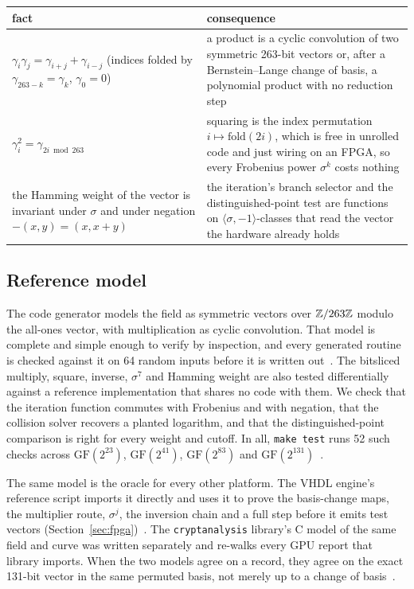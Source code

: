 \begin{center}
\small
\begin{tabular}{@{}p{}p{}@{}}
\toprule
fact & consequence \\
\midrule
$\gamma_i\gamma_j = \gamma_{i+j} + \gamma_{i-j}$
  (indices folded by $\gamma_{263-k}=\gamma_k$, $\gamma_0=0$)
  & a product is a cyclic convolution of two symmetric 263-bit
    vectors or, after a Bernstein--Lange change of basis, a
    polynomial product with no reduction step \\
$\gamma_i^2 = \gamma_{2i \bmod 263}$
  & squaring is the index permutation $i\mapsto\mathrm{fold}(2i)$,
    which is free in unrolled code and just wiring on an FPGA, so
    every Frobenius power $\sigma^k$ costs nothing \\
the Hamming weight of the vector is invariant under $\sigma$ and under
  negation $-(x,y)=(x,x+y)$
  & the iteration's branch selector and the distinguished-point test
    are functions on $\langle\sigma,-1\rangle$-classes that read the
    vector the hardware already holds \\
\bottomrule
\end{tabular}
\end{center}

\subsection{Reference model}
\label{sec:golden}

The code generator models the field as symmetric vectors over
$\mathbb{Z}/263\mathbb{Z}$ modulo the all-ones vector, with multiplication as
cyclic convolution. That model is complete and simple enough to verify by inspection, and
every generated routine is checked against it on 64 random inputs
before it is written out~.
The bitsliced multiply, square, inverse, $\sigma^7$ and Hamming weight
are also tested differentially against a reference implementation
that shares no code with them. We check that the iteration function
commutes with Frobenius and with negation, that the collision solver
recovers a planted logarithm, and that the distinguished-point
comparison is right for every weight and cutoff. In all,
\texttt{make test} runs 52 such checks across
$\mathrm{GF}(2^{23})$, $\mathrm{GF}(2^{41})$, $\mathrm{GF}(2^{83})$ and
$\mathrm{GF}(2^{131})$~.

The same model is the oracle for every other platform. The VHDL
engine's reference script imports it directly and uses it to prove the
basis-change maps, the multiplier route, $\sigma^j$, the inversion
chain and a full step before it emits test vectors
(Section~\ref{sec:fpga})~. The \texttt{cryptanalysis}
library's C model of the same field and curve
 was written separately
and re-walks every GPU report that library imports. When the two
models agree on a record, they agree on the exact 131-bit vector in
the same permuted basis, not merely up to a change of
basis~\cite{ecdlppaper}.

